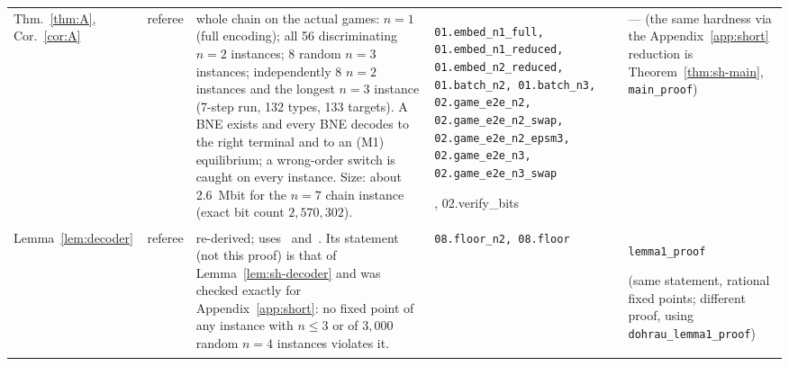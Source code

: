 \begin{longtable}{@{}p{2.7cm}p{1.1cm}p{4.2cm}p{3.75cm}p{3.05cm}@{}}
Thm.~\ref{thm:A}, Cor.~\ref{cor:A} & referee & whole chain on the actual games: $n=1$ (full encoding); all 56 discriminating $n=2$ instances; 8 random $n=3$ instances; independently 8 $n=2$ instances and the longest $n=3$ instance (7-step run, 132 types, 133 targets). A BNE exists and every BNE decodes to the right terminal and to an (M1) equilibrium; a wrong-order switch is caught on every instance. Size: about 2.6~Mbit for the $n=7$ chain instance (exact bit count $2{,}570{,}302$). & {\scriptsize\raggedright\texttt{01.embed\_n1\_full,\allowbreak{} 01.embed\_n1\_reduced,\allowbreak{} 01.embed\_n2\_reduced,\allowbreak{} 01.batch\_n2,\allowbreak{} 01.batch\_n3,\allowbreak{} 02.game\_e2e\_n2,\allowbreak{} 02.game\_e2e\_n2\_swap,\allowbreak{} 02.game\_e2e\_n2\_epsm3,\allowbreak{} 02.game\_e2e\_n3,\allowbreak{} 02.game\_e2e\_n3\_swap}\par},\allowbreak{} 02.verify\_bits & --- {\scriptsize(the same hardness via the Appendix~\ref{app:short} reduction is Theorem~\ref{thm:sh-main}, \texttt{main\_proof})}\\
Lemma~\ref{lem:decoder} & referee & re-derived; uses~\cite[Lemma~1]{dgkmw17} and~\cite[Lemma~14]{haslebacher25}. Its statement (not this proof) is that of Lemma~\ref{lem:sh-decoder} and was checked exactly for Appendix~\ref{app:short}: no fixed point of any instance with $n\le3$ or of $3{,}000$ random $n=4$ instances violates it. & {\scriptsize\raggedright\texttt{08.floor\_n2,\allowbreak{} 08.floor}\par} & {\scriptsize\raggedright\texttt{lemma1\_proof}} {\scriptsize(same statement, rational fixed points; different proof, using \texttt{dohrau\_lemma1\_proof})}\\

\end{longtable}
